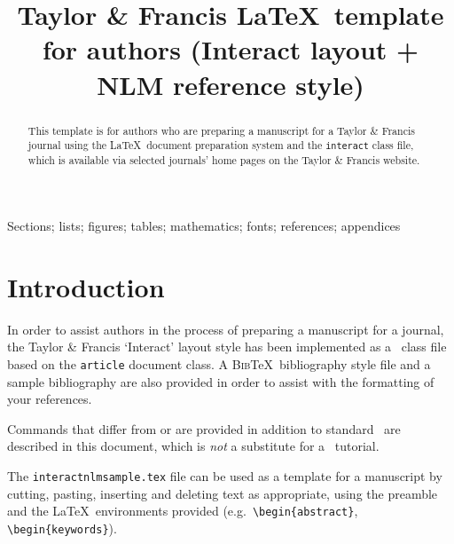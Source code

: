 \documentclass[]{interact}
\theoremstyle{plain}%
\theoremstyle{definition}
\theoremstyle{remark}
\begin{document}

\title{Taylor \& Francis \LaTeX\ template for authors (\textsf{Interact} layout + NLM reference style)}

\author{
}

\maketitle

\begin{abstract}
This template is for authors who are preparing a manuscript for a Taylor \& Francis journal using the \LaTeX\ document preparation system and the \texttt{interact} class file, which is available via selected journals' home pages on the Taylor \& Francis website.
\end{abstract}

\begin{keywords}
Sections; lists; figures; tables; mathematics; fonts; references; appendices
\end{keywords}


\section{Introduction}

In order to assist authors in the process of preparing a manuscript for a journal, the Taylor \& Francis `\textsf{Interact}' layout style has been implemented as a \LaTeXe\ class file based on the \texttt{article} document class. A \textsc{Bib}\TeX\ bibliography style file and a sample bibliography are also provided in order to assist with the formatting of your references.

Commands that differ from or are provided in addition to standard \LaTeXe\ are described in this document, which is \emph{not} a substitute for a \LaTeXe\ tutorial.

The \texttt{interactnlmsample.tex} file can be used as a template for a manuscript by cutting, pasting, inserting and deleting text as appropriate, using the preamble and the \LaTeX\ environments provided (e.g.\ \verb"\begin{abstract}", \verb"\begin{keywords}").
\end{document}
